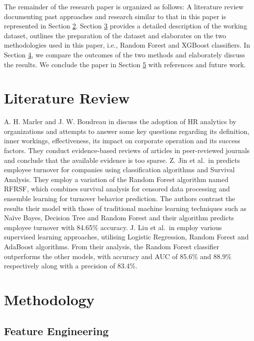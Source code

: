 \documentclass[runningheads]{llncs}
\begin{document}
The remainder of the research paper is organized as follows: A
literature review documenting past approaches and research similar to
that in this paper is represented in Section
\protect\hyperlink{literature-review}{2}. Section
\protect\hyperlink{methodology}{3} provides a detailed description of
the working dataset, outlines the preparation of the dataset and
elaborates on the two methodologies used in this paper, i.e., Random
Forest and XGBoost classifiers. In Section
\protect\hyperlink{results}{4}, we compare the outcomes of the two
methods and elaborately discuss the results. We conclude the paper in
Section \protect\hyperlink{conclusion}{5} with references and future
work.

\hypertarget{literature-review}{%
\section{Literature Review}\label{literature-review}}

A. H. Marler and J. W. Boudreau in
\cite{ref_Marler2017} discuss the adoption of HR
analytics by organizations and attempts to answer some key questions
regarding its definition, inner workings, effectiveness, its impact on
corporate operation and its success factors. They conduct evidence-based
reviews of articles in peer-reviewed journals and conclude that the
available evidence is too sparse. Z. Jin et al.~in
\cite{ref_Jin2020} predicts employee turnover for
companies using classification algorithms and Survival Analysis. They
employ a variation of the Random Forest algorithm named RFRSF, which
combines survival analysis for censored data processing and ensemble
learning for turnover behavior prediction. The authors contrast the
results their model with those of traditional machine learning
techniques such as Naïve Bayes, Decision Tree and Random Forest and
their algorithm predicts employee turnover with 84.65\% accuracy. J. Liu
et al.~in \cite{ref_Liu2019} employ various
supervised learning approaches, utilising Logistic Regression, Random
Forest and AdaBoost algorithms. From their analysis, the Random Forest
classifier outperforms the other models, with accuracy and AUC of 85.6\%
and 88.9\% respectively along with a precision of 83.4\%.

\hypertarget{methodology}{%
\section{Methodology}\label{methodology}}

\hypertarget{feature-engineering}{%
\subsection{Feature Engineering}\label{feature-engineering}}
\end{document}
